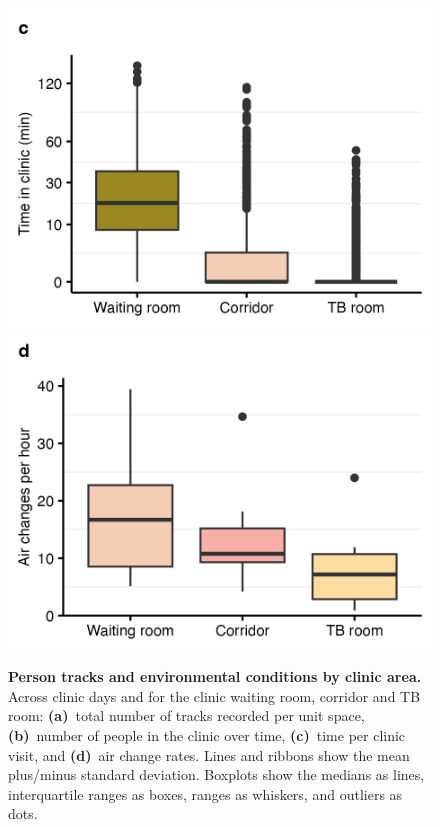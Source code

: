 \documentclass[fleqn,11pt]{wlscirep}
\begin{document}
\begin{figure}
    \includegraphics{results/data/time-in-clinic.png}
    \includegraphics{results/data/air-changes-per-hour.png}
    \caption{\textbf{Person tracks and environmental conditions by clinic area.} Across clinic days and for the clinic waiting room, corridor and TB room: \textbf{(a)}~total number of tracks recorded per unit space, \textbf{(b)}~number of people in the clinic over time, \textbf{(c)}~time per clinic visit, and \textbf{(d)}~air change rates. Lines and ribbons show the mean plus/minus standard deviation. Boxplots show the medians as lines, interquartile ranges as boxes, ranges as whiskers, and outliers as dots.}
    \label{fig:input-data-descriptives}
\end{figure}
\end{document}
